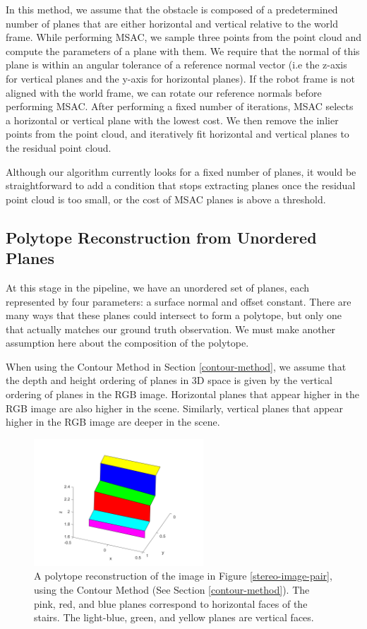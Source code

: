 In this method, we assume that the obstacle is composed of a predetermined number of planes that are either horizontal and vertical relative to the world frame. While performing MSAC, we sample three points from the point cloud and compute the parameters of a plane with them. We require that the normal of this plane is within an angular tolerance of a reference normal vector (i.e the z-axis for vertical planes and the y-axis for horizontal planes). If the robot frame is not aligned with the world frame, we can rotate our reference normals before performing MSAC. After performing a fixed number of iterations, MSAC selects a horizontal or vertical plane with the lowest cost. We then remove the inlier points from the point cloud, and iteratively fit horizontal and vertical planes to the residual point cloud.

Although our algorithm currently looks for a fixed number of planes, it would be straightforward to add a condition that stops extracting planes once the residual point cloud is too small, or the cost of MSAC planes is above a threshold.

\subsection{Polytope Reconstruction from Unordered Planes} \label{polytope-section}

At this stage in the pipeline, we have an unordered set of planes, each represented by four parameters: a surface normal and offset constant. There are many ways that these planes could intersect to form a polytope, but only one that actually matches our ground truth observation. We must make another assumption here about the composition of the polytope.

When using the Contour Method in Section \ref{contour-method}, we assume that the depth and height ordering of planes in 3D space is given by the vertical ordering of planes in the RGB image. Horizontal planes that appear higher in the RGB image are also higher in the scene. Similarly, vertical planes that appear higher in the RGB image are deeper in the scene.

\begin{figure}[!h]
\centering
\includegraphics[width=2.5in]{Sections/Figures/polytope_example.png}
\caption{A polytope reconstruction of the image in Figure \ref{stereo-image-pair}, using the Contour Method (See Section \ref{contour-method}). The pink, red, and blue planes correspond to horizontal faces of the stairs. The light-blue, green, and yellow planes are vertical faces.}
\label{polytope-diagonal-contour}
\end{figure}


